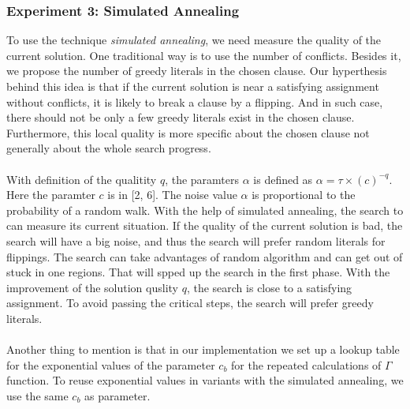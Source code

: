 \documentclass[12pt,a4paper,twoside]{scrartcl}
\numberwithin{equation}{section}
\begin{document}
\subsubsection{Experiment 3: Simulated Annealing} 
\label{sec:Experiment 3}
To use the technique \emph{simulated annealing}, we need measure the quality of the current solution.  One traditional way is to use the number of conflicts. Besides it, we propose the number of greedy literals in the chosen clause. Our hyperthesis behind this idea is that if the current solution is near a satisfying assignment without conflicts,  it is likely to break a clause by a flipping.  And in such case, there should not be only a few greedy literals exist in the chosen clause. Furthermore,  this local quality is more specific about the chosen clause not generally about the whole search progress. \\
\\
With definition of the qualitity $q$, the paramters $\alpha$ is defined as $\alpha = \tau \times (c)^{-q}$. Here the paramter $c$ is in [2, 6]. The noise value $\alpha$ is proportional to the probability of a random walk. With the help of simulated annealing, the search to can measure its current situation. If the quality of the current solution is bad, the search will have a big noise, and thus the search will prefer random literals for flippings. The search can take advantages of random algorithm and can get out of stuck in one regions. That will spped up the search in the first phase. With the improvement of the solution quslity $q$, the search is close to a satisfying assignment. To avoid passing the critical steps, the search will prefer greedy literals. \\
\\
Another thing to mention is that in our implementation we set up a lookup table for the exponential values of the parameter $c_b$ for the repeated calculations of $\Gamma$ function. To reuse exponential values in variants with the simulated annealing, we use the same  $c_b$ as parameter. \\
\\
\end{document}
